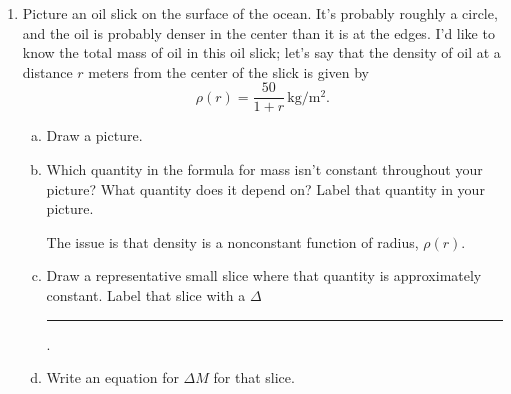 \documentclass[12pt]{article}
\newenvironment{red}{\color{red}}{\ignorespacesafterend}
\begin{document}
\begin{enumerate}
\begin{enumerate}[(a)]
\begin{red}
    \[K_{total} = \int_0^{0.1} \frac{1}{2}\cdot 0.3 \left(\frac{2\pi r}{60}\right)^2\, dr\]
\end{red}
\item Evaluate the integral, assign it the proper units, and explain the meaning of your result.

\begin{red}
    \begin{align*} 
        \int_{0}^{0.1} \frac{1}{2} \cdot 0.3 \left(\frac{2\pi r}{60} \right)^2\ dr 
        & = 0.001645 \int_0^{0.1} r^2\, dr \\ 
        & = 0.000548 r^3 \bigg|_0^{0.1}\\ 
        & = \SI{5.483e-7}{J}
    \end{align*}
    So, the rod has a total energy of $\SI{5.483e-7}{J}$.
\end{red}
\item Describe the meaning of each factor of your integral, and give its units.

\begin{red}
    \[\int_0^{0.1} \underbrace{\frac{1}{2} \left(\underbrace{\frac{2\pi r}{60}}_{\text{Velocity of a slice at radius \(r\) (m/s)}\quad }\right)^2 \underbrace{\overbrace{0.3}^{\text{density (kg/m)}}\cdot \overbrace{dr}^{\text{thickness of slice (m)}}}_{\quad \text{mass of a slice of}\ ``\text{thickness \(dr\)" (kg)} } }_{ \text{kinetic energy of a slice of}\ ``\text{thickness \(dr\)" (J)} } \]
\end{red}
\end{enumerate}

\item Picture an oil slick on the surface of the ocean. It's probably roughly a circle, and the oil is probably denser in the center than it is at the edges. I'd like to know the total mass of oil in this oil slick; let's say that the density of oil at a distance \(r\) meters from the center of the slick is given by \[\rho(r) = \dfrac{50}{1 + r}\, \unit{\kg / \m^2}.\]
\begin{enumerate}[(a)]
    \item Draw a picture.
    \item Which quantity in the formula for mass isn't constant throughout your picture? What quantity does it depend on? Label that quantity in your picture.

    \begin{red}
        The issue is that density is a nonconstant function of radius, $\rho(r)$.
    \end{red}
    \item Draw a representative small slice where that quantity is approximately constant. Label that slice with a \(\Delta\)\rule{0.5cm}{0.15mm}.
    \item Write an equation for \(\Delta M\) for that slice.


\end{enumerate}
\end{enumerate}
\end{document}
